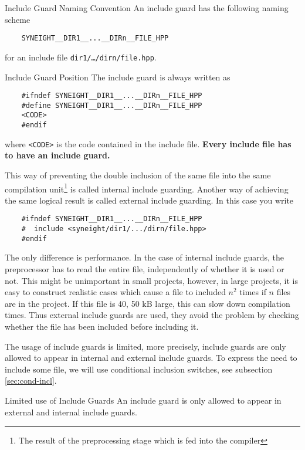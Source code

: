 \begin{rule*}{Include Guard Naming Convention}
  An include guard has the following naming scheme
  \begin{verbatim}
    SYNEIGHT__DIR1__...__DIRn__FILE_HPP
  \end{verbatim}
  for an include file {\tt dir1/\dots/dirn/file.hpp}.
\end{rule*}
%
\begin{rule*}{Include Guard Position}
  The include guard is always written as 
  \begin{verbatim}
    #ifndef SYNEIGHT__DIR1__...__DIRn__FILE_HPP
    #define SYNEIGHT__DIR1__...__DIRn__FILE_HPP
    <CODE>
    #endif
  \end{verbatim}
  where {\tt <CODE>} is the code contained in the include file. 
  \textbf{Every include file has to have an include guard.}
\end{rule*}
%
This way of preventing the double inclusion of the same file into the
same compilation unit\footnote{The result of the preprocessing stage
  which is fed into the compiler} is called internal include
guarding. 
%
Another way of achieving the same logical result is called external
include guarding. In this case you write 
\begin{verbatim}
    #ifndef SYNEIGHT__DIR1__...__DIRn__FILE_HPP
    #  include <syneight/dir1/.../dirn/file.hpp>
    #endif
\end{verbatim}
The only difference is performance. In the case of internal include
guards, the preprocessor has to read the entire file, independently of
whether it is used or not. This might be unimportant in small
projects, however, in large projects, it is easy to construct
realistic cases which cause a file to included $n^2$ times if $n$
files are in the project. If this file is 40, 50 kB large, this can
slow down compilation times. 
%
Thus external include guards are used, they avoid the problem by
checking whether the file has been included before including it. 
%

The usage of include guards is limited, more precisely, include guards
are only allowed to appear in internal and external include guards. To
express the need to include some file, we will use conditional
inclusion switches, see subsection \vref{sec:cond-incl}.
\begin{rule*}{Limited use of Include Guards}
  An include guard is only allowed to appear in external and internal
  include guards.
\end{rule*}


